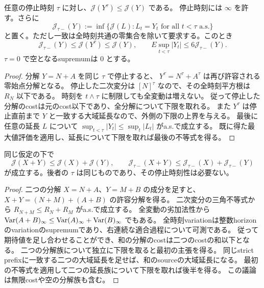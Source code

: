 \begin{lemma}[閉じた停止と停止直前の延長の下限]
任意の停止時刻 $\tau$ に対し、$\mathcal J(Y^\tau)\le\mathcal J(Y)$ である。
停止時刻には $\infty$ を許す。さらに
\[
 \mathcal J_{\tau-}(Y):=
 \inf\{\mathcal J(L):L_t=Y_t\text{ for all }t<\tau\text{ a.s.}\}
\]
と置く。ただし一致は全時刻共通の零集合を除いて要求する。このとき
\[
 \mathcal J_{\tau-}(Y)\le\mathcal J(Y^\tau)\le\mathcal J(Y),\qquad
 E\sup_{t<\tau}|Y_t|\le6\mathcal J_{\tau-}(Y).
\]
$\tau=0$ で空となるsupremumは $0$ とする。
\end{lemma}
\begin{proof}
分解 $Y=N+A$ を同じ $\tau$ で停止すると、
$Y^\tau=N^\tau+A^\tau$ は再び許容される零始点分解となる。
停止した二次変分は $[N]^\tau$ なので、その全時刻平方根は $R_N$ 以下である。
時刻を $t\wedge\tau$ に制限しても全変動は増えない。
従って停止した分解のcostは元のcost以下であり、全分解について下限を取れる。
また $Y^\tau$ は停止直前まで $Y$ と一致する大域延長なので、外側の下限の上界を与える。
最後に任意の延長 $L$ について $\sup_{t<\tau}|Y_t|\le\sup_t|L_t|$ がa.s.で成立する。
既に得た最大値評価を適用し、延長について下限を取れば最後の不等式を得る。
\end{proof}

\begin{lemma}[二つの下限の三角不等式]
同じ仮定の下で
\[
 \mathcal J(X+Y)\le\mathcal J(X)+\mathcal J(Y),\qquad
 \mathcal J_{\tau-}(X+Y)\le\mathcal J_{\tau-}(X)+\mathcal J_{\tau-}(Y)
\]
が成立する。後者の $\tau$ は同じものであり、その停止時刻性は必要ない。
\end{lemma}
\begin{proof}
二つの分解 $X=N+A$、$Y=M+B$ の成分を足すと、$X+Y=(N+M)+(A+B)$ の許容分解を得る。
二次変分の三角不等式から $R_{N+M}\le R_N+R_M$ がa.s.で成立する。
全変動の劣加法性から $\operatorname{Var}(A+B)_\infty\le\operatorname{Var}(A)_\infty+\operatorname{Var}(B)_\infty$ でもある。
全時刻variationは整数horizonのvariationのsupremumであり、右連続な適合過程について可測である。
従って期待値を足し合わせることができ、和の分解のcostは二つのcostの和以下となる。
二つの分解族について独立に下限を取ると最初の主張を得る。
同じstrict prefixに一致する二つの大域延長を足せば、和のsourceの大域延長になる。
最初の不等式を適用して二つの延長族について下限を取れば後半を得る。
この議論は無限costや空の分解族も含む。
\end{proof}

